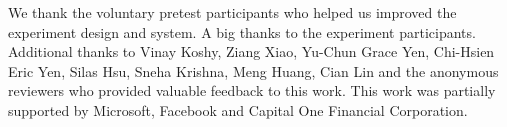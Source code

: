 \begin{acks}
We thank the voluntary pretest participants who helped us improved the experiment design and system. A big thanks to the experiment participants. Additional thanks to Vinay Koshy, Ziang Xiao, Yu-Chun Grace Yen, Chi-Hsien Eric Yen, Silas Hsu, Sneha Krishna, Meng Huang, Cian Lin and the anonymous reviewers who provided valuable feedback to this work. This work was partially supported by Microsoft, Facebook and Capital One Financial Corporation. 
\end{acks}


